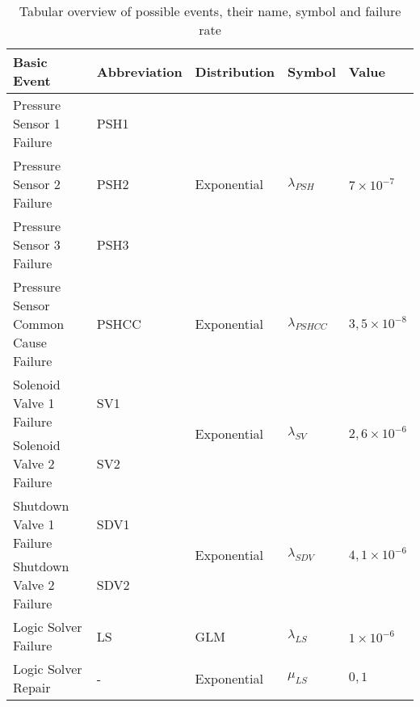 \begin{table}[!ht]
\centering
\renewcommand{\arraystretch}{1.4}
\label{tab:events}
\begin{tabular}{|l|l|l|l|l|}
\hline
\textbf{Basic Event}                       & \textbf{Abbreviation} & \textbf{Distribution}        & \textbf{Symbol}       & \textbf{Value}      \\ \hline
Pressure Sensor 1 Failure             & PSH1                      & \multirow{3}{*}{Exponential}                  & \multirow{3}{*}{$\lambda_{PSH}$}    & \multirow{3}{*}{$7\times10^{-7}$}  \\ \cline{1-2}
Pressure Sensor 2 Failure             & PSH2                      &                              &                       &                     \\ \cline{1-2}
Pressure Sensor 3 Failure             & PSH3                      &                              &                       &                     \\ \hline
Pressure Sensor Common Cause Failure & PSHCC                     & Exponential                  & $\lambda_{PSHCC}$                     & $3,5\times10^{-8}$                  \\ \hline
Solenoid Valve 1 Failure             & SV1                       & \multirow{2}{*}{Exponential} &  \multirow{2}{*}{$\lambda_{SV}$}   & \multirow{2}{*}{$2,6\times10^{-6}$} \\ \cline{1-2}
Solenoid Valve 2 Failure             & SV2                       &                              &                       &                     \\ \hline
Shutdown Valve 1 Failure             & SDV1                      & \multirow{2}{*}{Exponential} &  \multirow{2}{*}{$\lambda_{SDV}$} & \multirow{2}{*}{$4,1\times10^{-6}$} \\ \cline{1-2}
Shutdown Valve 2 Failure             & SDV2                      &                              &                       &                     \\ \hline
Logic Solver Failure                 & LS                        & GLM                          &  $\lambda_{LS}$                     & $1\times10^{-6}$                   \\ \hline
Logic Solver Repair                 & -                        & Exponential                          &  $\mu_{LS}$                     & $0,1$                   \\ \hline
\end{tabular}
\caption{Tabular overview of possible events, their name, symbol and failure rate}
\end{table}

